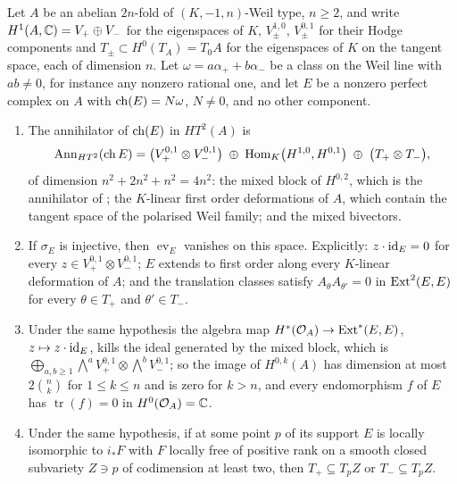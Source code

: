 \begin{theorem}
\label{thm:p2forces}
Let $A$ be an abelian $2n$-fold of $(K,-1,n)$-Weil type, $n\ge2$, and write
$H^{1}(A,\mathbb{C})=V_{+}\oplus V_{-}$ for the eigenspaces of $K$,
$V_{\pm}^{1,0}$, $V_{\pm}^{0,1}$ for their Hodge components and
$T_{\pm}\subset H^{0}(T_{A})=T_{0}A$ for the eigenspaces of $K$ on the tangent
space, each of dimension $n$. Let $\omega=a\alpha_{+}+b\alpha_{-}$ be a
class on the Weil line with $ab\ne0$, for instance any nonzero rational one,
and let $E$ be a nonzero perfect complex on $A$ with $\operatorname{ch}(E)=N\omega$,
$N\ne0$, and no other component.
\begin{enumerate}[label=\textup{(\roman*)},leftmargin=2.6em,itemsep=2pt]
\item The annihilator of $\operatorname{ch}(E)$ in $HT^{2}(A)$ is
  \[
    \operatorname{Ann}_{HT^{2}}(\operatorname{ch} E)
    =\bigl(V_{+}^{0,1}\otimes V_{-}^{0,1}\bigr)
    \;\oplus\;\operatorname{Hom}_{K}\bigl(H^{1,0},H^{0,1}\bigr)
    \;\oplus\;\bigl(T_{+}\otimes T_{-}\bigr),
  \]
  of dimension $n^{2}+2n^{2}+n^{2}=4n^{2}$: the mixed block of $H^{0,2}$,
  which is the annihilator of ; the $K$-linear first
  order deformations of $A$, which contain the tangent space of the polarised
  Weil family; and the mixed bivectors.
\item If $\sigma_{E}$ is injective, then $\operatorname{ev}_{E}$ vanishes on
  this space. Explicitly: $z\cdot\operatorname{id}_{E}=0$ for every $z\in V_{+}^{0,1}\otimes
  V_{-}^{0,1}$; $E$ extends to first order along every $K$-linear deformation
  of $A$; and the translation classes satisfy $A_{\theta}A_{\theta'}=0$ in
  $\operatorname{Ext}^{2}(E,E)$ for every $\theta\in T_{+}$ and $\theta'\in T_{-}$.
\item Under the same hypothesis the algebra map $H^{*}(\mathcal{O}_{A})\to\operatorname{Ext}^{*}(E,E)$,
  $z\mapsto z\cdot\operatorname{id}_{E}$, kills the ideal generated by the mixed block,
  which is $\bigoplus_{a,b\ge1}\bigwedge^{a}V_{+}^{0,1}\otimes\bigwedge^{b}V_{-}^{0,1}$;
  so the image of $H^{0,k}(A)$ has dimension at most $2\binom{n}{k}$ for
  $1\le k\le n$ and is zero for $k>n$, and every endomorphism $f$ of $E$ has
  $\operatorname{tr}(f)=0$ in $H^{0}(\mathcal{O}_{A})=\mathbb{C}$.
\item Under the same hypothesis, if at some point $p$ of its support $E$ is
  locally isomorphic to $i_{*}F$ with $F$ locally free of positive rank on a
  smooth closed subvariety $Z\ni p$ of codimension at least two, then
  $T_{+}\subseteq T_{p}Z$ or $T_{-}\subseteq T_{p}Z$.
\end{enumerate}
\end{theorem}

